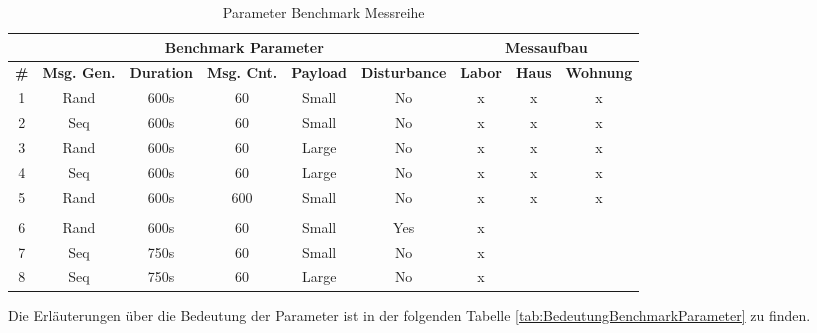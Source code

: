 \begin{table}[h]
\centering
\begin{adjustbox}{width=1\textwidth}
\begin{tabular}{|c|c|c|c|c|c|c|c|c|} 
\cline{2-9}
\multicolumn{1}{c|}{} & \multicolumn{5}{c|}{Benchmark Parameter} & \multicolumn{3}{c|}{Messaufbau} \\ 
\hline
\textbf{\#}  & \textbf{Msg. Gen.}  & \textbf{Duration} & \textbf{Msg. Cnt.}  & \textbf{Payload }  & \textbf{Disturbance}  & \textbf{Labor}  & \textbf{Haus}  & \textbf{Wohnung}  \\ 
\hline
1 & Rand & 600s & 60 & Small & No & x & x & x \\ 
\hline
2 & Seq & 600s & 60 & Small & No & x & x & x \\ 
\hline
3 & Rand & 600s & 60 & Large & No & x & x & x \\ 
\hline
4 & Seq & 600s & 60 & Large & No & x & x & x \\ 
\hline
5 & Rand & 600s & 600 & Small & No & x & x & x \\ 
\hline
\multicolumn{1}{c}{} & \multicolumn{1}{c}{} & \multicolumn{1}{c}{} & \multicolumn{1}{c}{} & \multicolumn{1}{c}{} & \multicolumn{1}{c}{} & \multicolumn{1}{c}{} & \multicolumn{1}{c}{} & \multicolumn{1}{c}{} \\ 
\hline
6 & Rand & 600s & 60 & Small & Yes & x &  &  \\ 
\hline
7 & Seq & 750s & 60 & Small & No & x &  &  \\ 
\hline
8 & Seq & 750s & 60 & Large & No & x &  &  \\
\hline
\end{tabular}
\end{adjustbox}
\caption{Parameter Benchmark Messreihe}
\label{tab:ParameterBenchmarkMessreihe}
\end{table}

Die Erläuterungen über die Bedeutung der Parameter ist in der folgenden Tabelle \ref{tab:BedeutungBenchmarkParameter} zu finden. 

